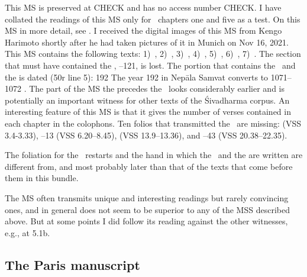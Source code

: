 This MS is preserved at CHECK and has no access number CHECK.
I have collated the readings of this MS only for \VSS\ 
chapters one and five as a test.
On this MS in more detail, see .
I received the digital images of this MS from Kengo Harimoto
shortly after he had taken pictures of it in Munich on  Nov 16, 2021. 
This MS contains the following texts:
1)~\SDhS, 
2)~\SDhU, 
3)~, 
4)~,
5)~\Vss, 
6)~\Uums,
7)~. 
The section that must have contained the , --121, is lost. The portion that
contains the \VSS\ and the \skttitle{Dharmaputrikā}{Dharmaputrika}
is dated (\fol50r line 5):  192  The year 192 in Nepāla Samvat converts to 
1071--1072 \CE. The part of the MS the precedes the \VSS\ looks
considerably earlier and is potentially an important witness for
other texts of the Śivadharma corpus. An interesting 
feature of this MS is that it gives the number of verses contained in
each chapter in the colophons. Ten folios that transmitted the \VSS\
are missing: 
\fol5 (VSS 3.4-3.33),
--13 (VSS 6.20--8.45),
 (VSS 13.9--13.36), and
--43 (VSS 20.38--22.35). 

The foliation for the \VSS\ restarts
and the hand in which the \VSS\ and the  are written are different from, and
most probably later than that of the texts that come 
before them in this bundle. 

The MS often transmits unique and interesting readings
but rarely convincing ones, and in general does not seem to be superior 
to any of the MSS described above. But at some points
I did follow its reading against the other witnesses, e.g., at 5.1b.


\medskip
\subsection{The Paris manuscript}

